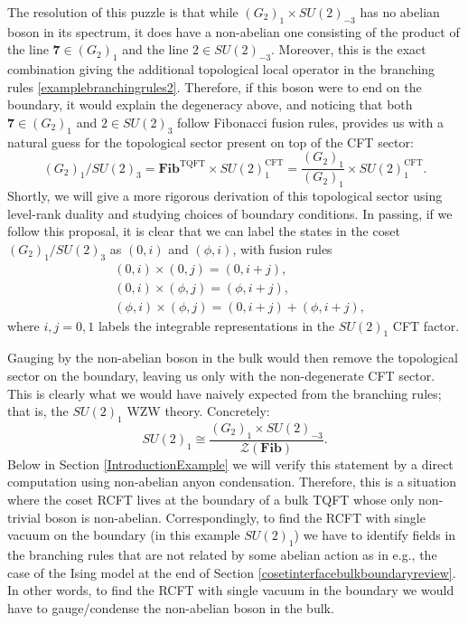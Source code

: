 \documentclass[11pt]{article}
\numberwithin{equation}{section}
\begin{document}
The resolution of this puzzle is that while $(G_{2})_{1} \times SU(2)_{-3}$  has no abelian boson in its spectrum, it does have a non-abelian one consisting of the product of the line $\mathbf{7} \in (G_{2})_{1}$ and the line $2 \in SU(2)_{-3}$. Moreover, this is the exact combination giving the additional topological local operator in the branching rules \eqref{examplebranchingrules2}. Therefore, if this boson were to end on the boundary, it would explain the degeneracy above, and noticing that both $\mathbf{7} \in (G_{2})_{1}$ and $2 \in SU(2)_{3}$ follow Fibonacci fusion rules, provides us with a natural guess for the topological sector present on top of the CFT sector:
\begin{equation}
    (G_{2})_{1}/SU(2)_{3}  = \mathbf{Fib}^{\mathrm{TQFT}} \times SU(2)_{1}^{\mathrm{CFT}} = \frac{(G_{2})_{1}}{(G_{2})_{1}} \times SU(2)_{1}^{\mathrm{CFT}}. \label{secondcosettheory}
\end{equation}
Shortly, we will give a more rigorous derivation of this topological sector using level-rank duality and studying choices of boundary conditions. In passing, if we follow this proposal, it is clear that we can label the states in the coset $(G_{2})_{1}/SU(2)_{3}$ as $(0,i)$ and $(\phi,i)$, with fusion rules
\begin{align}
    &(0,i) \times (0,j) = (0,i+j), \\[0.3cm]
    &(0,i) \times (\phi,j) = (\phi,i+j), \\[0.3cm]
    &(\phi,i) \times (\phi,j) = (0,i+j) + (\phi,i+j),
\end{align}
where $i,j=0,1$ labels the integrable representations in the $SU(2)_{1}$ CFT factor.

Gauging by the non-abelian boson in the bulk would then remove the topological sector on the boundary, leaving us only with the non-degenerate CFT sector. This is clearly what we would have naively expected from the branching rules; that is, the $SU(2)_{1}$ WZW theory. Concretely:
\begin{equation}
    SU(2)_{1} \cong \frac{(G_{2})_{1} \times SU(2)_{-3}}{\mathcal{Z}(\mathbf{Fib})}.
\end{equation}
Below in Section \ref{IntroductionExample} we will verify this statement by a direct computation using non-abelian anyon condensation. Therefore, this is a situation where the coset RCFT lives at the boundary of a bulk TQFT whose only non-trivial boson is non-abelian. Correspondingly, to find the RCFT with single vacuum on the boundary (in this example $SU(2)_{1}$) we have to identify fields in the branching rules that are not related by some abelian action as in e.g., the case of the Ising model at the end of Section \ref{cosetinterfacebulkboundaryreview}. In other words, to find the RCFT with single vacuum in the boundary we would have to gauge/condense the non-abelian boson in the bulk.
\end{document}
